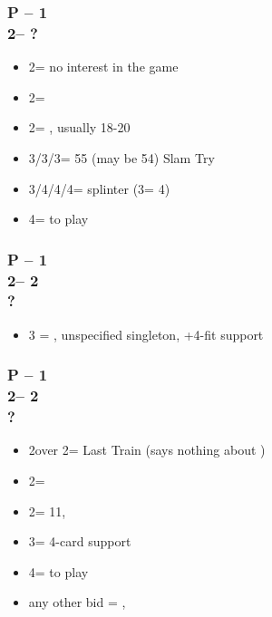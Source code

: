 \documentclass[12pt, a4paper]{article}
\begin{document}
\subsubsection*{P -- 1\spades \\ 2\clubs -- ?}
\begin{itemize}
    \item 2\spades = no interest in the game
    \item 2\diams = \inv
    \item 2\nt = \lsf, usually 18-20 \bal
    \item 3\clubs/3\diams/3\hearts = 55 (may be 54) Slam Try
    \item 3\nt/4\clubs/4\diams/4\hearts = splinter (3\nt = 4\hearts)
    \item 4\spades = to play
\end{itemize}

\subsubsection*{P -- 1\major \\ 2\clubs -- 2\major \\ ?}
\begin{itemize}
    \item 3 = \nat, unspecified singleton, +4-fit \major support
\end{itemize}

\subsubsection*{P -- 1\major \\ 2\clubs -- 2\diams \\ ?}
\begin{itemize}
    \item 2\hearts over 2\spades = Last Train (says nothing about \hearts)
    \item 2\major = \soff
    \item 2\nt = 11, \bal
    \item 3\major = 4-card support
    \item 4\major = to play
    \item any other bid = \nat, \inv
\end{itemize}

\end{document}
